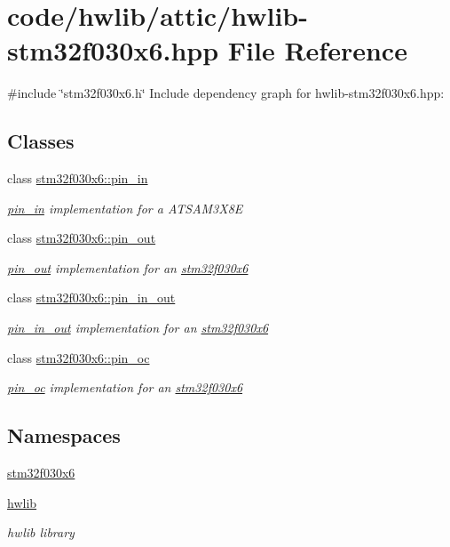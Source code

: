 \hypertarget{hwlib-stm32f030x6_8hpp}{}\section{code/hwlib/attic/hwlib-\/stm32f030x6.hpp File Reference}
\label{hwlib-stm32f030x6_8hpp}
{\ttfamily \#include \char`\"{}stm32f030x6.\+h\char`\"{}}\newline
Include dependency graph for hwlib-\/stm32f030x6.hpp\+:
\subsection*{Classes}
\begin{DoxyCompactItemize}
\item 
class \hyperlink{classstm32f030x6_1_1pin__in}{stm32f030x6\+::pin\+\_\+in}
\begin{DoxyCompactList}\small\item\em \hyperlink{classstm32f030x6_1_1pin__in}{pin\+\_\+in} implementation for a A\+T\+S\+A\+M3\+X8E \end{DoxyCompactList}\item 
class \hyperlink{classstm32f030x6_1_1pin__out}{stm32f030x6\+::pin\+\_\+out}
\begin{DoxyCompactList}\small\item\em \hyperlink{classstm32f030x6_1_1pin__out}{pin\+\_\+out} implementation for an \hyperlink{namespacestm32f030x6}{stm32f030x6} \end{DoxyCompactList}\item 
class \hyperlink{classstm32f030x6_1_1pin__in__out}{stm32f030x6\+::pin\+\_\+in\+\_\+out}
\begin{DoxyCompactList}\small\item\em \hyperlink{classstm32f030x6_1_1pin__in__out}{pin\+\_\+in\+\_\+out} implementation for an \hyperlink{namespacestm32f030x6}{stm32f030x6} \end{DoxyCompactList}\item 
class \hyperlink{classstm32f030x6_1_1pin__oc}{stm32f030x6\+::pin\+\_\+oc}
\begin{DoxyCompactList}\small\item\em \hyperlink{classstm32f030x6_1_1pin__oc}{pin\+\_\+oc} implementation for an \hyperlink{namespacestm32f030x6}{stm32f030x6} \end{DoxyCompactList}\end{DoxyCompactItemize}
\subsection*{Namespaces}
\begin{DoxyCompactItemize}
\item 
 \hyperlink{namespacestm32f030x6}{stm32f030x6}
\item 
 \hyperlink{namespacehwlib}{hwlib}
\begin{DoxyCompactList}\small\item\em hwlib library \end{DoxyCompactList}\end{DoxyCompactItemize}
